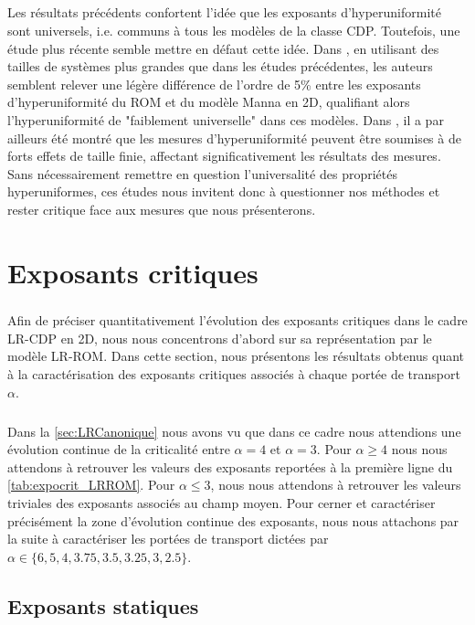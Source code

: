 \subparagraph{}Les résultats précédents confortent l'idée que les exposants d'hyperuniformité sont universels, i.e. communs à tous les modèles de la classe CDP. Toutefois, une étude plus récente semble mettre en défaut cette idée. Dans \cite{bub_lee_hyperuniformity_2019}, en utilisant des tailles de systèmes plus grandes que dans les études précédentes, les auteurs semblent relever une légère différence de l'ordre de 5\% entre les exposants d'hyperuniformité du ROM et du modèle Manna en 2D, qualifiant alors l'hyperuniformité de "faiblement universelle" dans ces modèles. Dans \cite{wiese_hyperuniformity_2024}, il a par ailleurs été montré que les mesures d'hyperuniformité peuvent être soumises à de forts effets de taille finie, affectant significativement les résultats des mesures. Sans nécessairement remettre en question l'universalité des propriétés hyperuniformes, ces études nous invitent donc à questionner nos méthodes et rester critique face aux mesures que nous présenterons.

\section{Exposants critiques}

\subparagraph{}Afin de préciser quantitativement l'évolution des exposants critiques dans le cadre LR-CDP en 2D, nous nous concentrons d'abord sur sa représentation par le modèle LR-ROM. Dans cette section, nous présentons les résultats obtenus quant à la caractérisation des exposants critiques associés à chaque portée de transport $\alpha$.

\subparagraph{}Dans la \autoref{sec:LRCanonique} nous avons vu que dans ce cadre nous attendions une évolution continue de la criticalité entre $\alpha = 4$ et $\alpha=3$. Pour $\alpha\geq 4$ nous nous attendons à retrouver les valeurs des exposants reportées à la première ligne du \autoref{tab:expocrit_LRROM}. Pour $\alpha\leq 3$, nous nous attendons à retrouver les valeurs triviales des exposants associés au champ moyen. Pour cerner et caractériser précisément la zone d'évolution continue des exposants, nous nous attachons par la suite à caractériser les portées de transport dictées par $\alpha \in \{ 6, 5, 4, 3.75, 3.5, 3.25, 3, 2.5  \}$.

\label{sec:expcritjumps}

\subsection{Exposants statiques}

